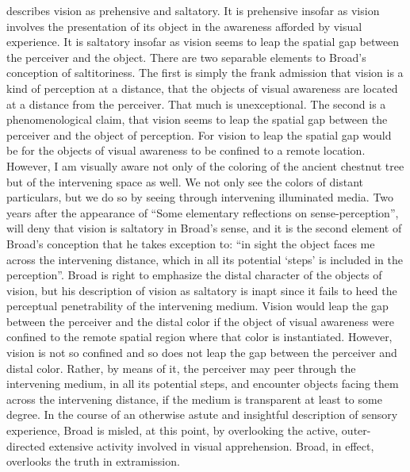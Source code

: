\citet{Broad:1952kx} describes vision as prehensive and saltatory. It is prehensive insofar as vision involves the presentation of its object in the awareness afforded by visual experience. It is saltatory insofar as vision seems to leap the spatial gap between the perceiver and the object. There are two separable elements to Broad's conception of saltitoriness. The first is simply the frank admission that vision is a kind of perception at a distance, that the objects of visual awareness are located at a distance from the perceiver. That much is unexceptional. The second is a phenomenological claim, that vision seems to leap the spatial gap between the perceiver and the object of perception. For vision to leap the spatial gap would be for the objects of visual awareness to be confined to a remote location. However, I am visually aware not only of the coloring of the ancient chestnut tree but of the intervening space as well. We not only see the colors of distant particulars, but we do so by seeing through intervening illuminated media. Two years after the appearance of “Some elementary reflections on sense-perception”, \citet[518]{Jonas:1954aa} will deny that vision is saltatory in Broad’s sense, and it is the second element of Broad's conception that he takes exception to: “in sight the object faces me across the intervening distance, which in all its potential ‘steps’ is included in the perception”. Broad is right to emphasize the distal character of the objects of vision, but his description of vision as saltatory is inapt since it fails to heed the perceptual penetrability of the intervening medium. Vision would leap the gap between the perceiver and the distal color if the object of visual awareness were confined to the remote spatial region where that color is instantiated. However, vision is not so confined and so does not leap the gap between the perceiver and distal color. Rather, by means of it, the perceiver may peer through the intervening medium, in all its potential steps, and encounter objects facing them across the intervening distance, if the medium is transparent at least to some degree. In the course of an otherwise astute and insightful description of sensory experience, Broad is misled, at this point, by overlooking the active, outer-directed extensive activity involved in visual apprehension. Broad, in effect, overlooks the truth in extramission.

